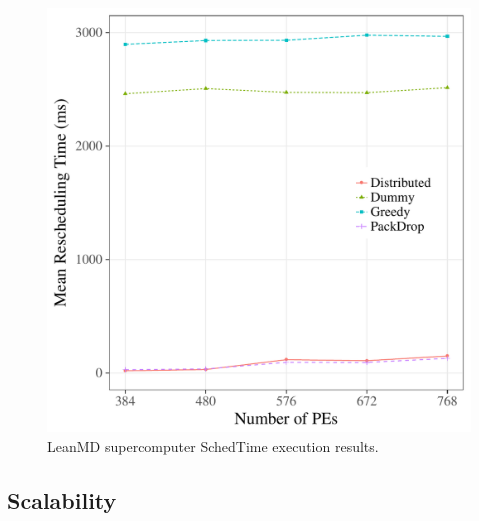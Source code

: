 \begin{figure}
	\centering
	\includegraphics[width=0.9\linewidth]{images/schedtime_leanmd_sdumont.pdf}
	\caption{LeanMD supercomputer SchedTime execution results.}
	\label{fig:eval:sdumont:leanmd:schedtime}
\end{figure}




\subsection{Scalability}